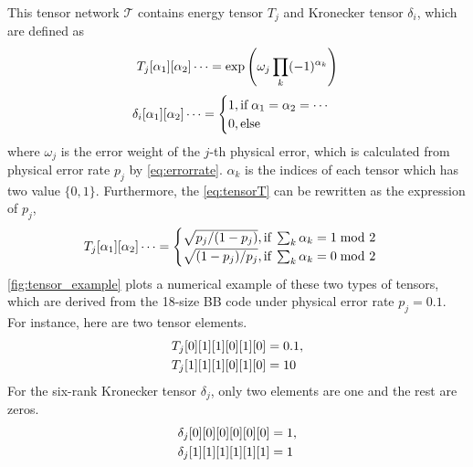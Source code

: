 This tensor network $\mathcal{T}$ contains energy tensor $T_j$ and Kronecker tensor $\delta_i$, which are defined as
\begin{equation} \label{eq:tensorT}\small
    T_j[\alpha_1][\alpha_2]\cdots= \exp \left(\omega_j \prod_{k} (-1)^{\alpha_k}\right)
\end{equation}
\begin{equation}\small
    \delta_i[\alpha_1][\alpha_2]\cdots = \begin{cases}
        1,\text{if}\;\alpha_1 =\alpha_2 = \cdots \\
        0, \text{else}
    \end{cases}\label{eq:tensordelta}
\end{equation}
where $\omega_j$ is the error weight of the $j$-th physical error, which is calculated from physical error rate $p_j$ by \eqref{eq:errorrate}. $\alpha_k$ is the indices of each tensor which has two value $\{0,1\}$. Furthermore, the \eqref{eq:tensorT} can be rewritten as the expression of $p_j$,
\begin{equation} \label{eq:tensorTcases}\small
    T_j[\alpha_1][\alpha_2]\cdots= \begin{cases}
        \sqrt{p_j/(1-p_j)},\text{if}\; \sum_{k} \alpha_k = 1\;\text{mod 2}\\
        \sqrt{(1-p_j)/p_j}, \text{if}\; \sum_{k} \alpha_k = 0\; \text{mod 2}
    \end{cases}
\end{equation}
\autoref{fig:tensor_example} plots a numerical example of these two types of tensors, which are derived from the 18-size BB code under physical error rate $p_j=0.1$. For instance, here are two tensor elements.
\begin{equation} \small
\begin{aligned}
    & T_j[0][1][1][0][1][0]= 0.1, \\
    & T_j[1][1][1][0][1][0]= 10 \notag    
\end{aligned}
\end{equation}
For the six-rank Kronecker tensor $\delta_j$, only two elements are one and the rest are zeros.
\begin{equation} \small
\begin{aligned}
    & \delta_j[0][0][0][0][0][0]= 1, \\
    & \delta_j[1][1][1][1][1][1]= 1 \notag    
\end{aligned}
\end{equation}


